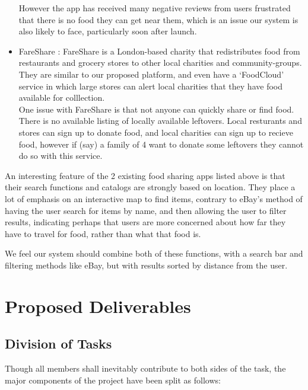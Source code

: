 \documentclass[12pt]{article}
\begin{document}
\begin{itemize}
        However the app has received many negative reviews from users frustrated
        that there is no food they can get near them, which is an issue our
        system is also likely to face, particularly soon after launch.
        
    \item FareShare \cite{fareshare}:
		FareShare is a London-based charity that redistributes food from restaurants
		and grocery stores to other local charities and community-groups. They are similar
		to our proposed platform, and even have a `FoodCloud' service in which large stores
		can alert local charities that they have food available for colllection.\\
		One issue with FareShare is that not anyone can quickly share or find food. There is no available listing of locally available leftovers.
		Local resturants and stores can sign up to donate food, and local charities can sign up to recieve food, however
		if (say) a family of 4 want to donate some leftovers they cannot do so with this service.
\end{itemize}

An interesting feature of the 2 existing food sharing apps listed above is that
their search functions and catalogs are strongly based on location.
They place a lot of emphasis on an interactive map to find items, contrary to
eBay’s method of having the user search for items by name, and then allowing
the user to filter results, indicating perhaps that users are more concerned
about how far they have to travel for food, rather than what that food is.

We feel our system should combine both of these functions, with a search bar
and filtering methods like eBay, but with results sorted by distance from the user.

\pagebreak

\section{Proposed Deliverables}
\subsection{Division of Tasks}

Though all members shall inevitably contribute to both sides of the task,
the major components of the project have been split as follows:
\end{document}
